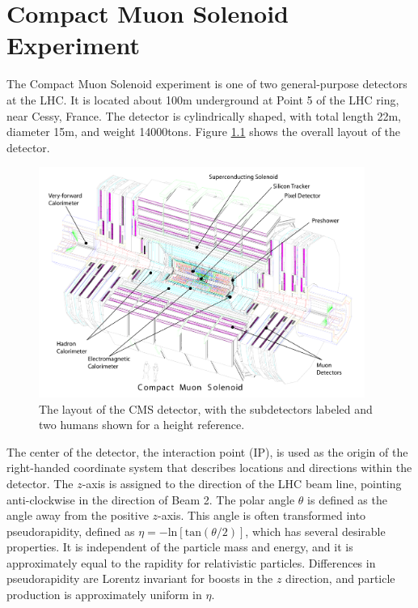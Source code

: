 \chapter{Compact Muon Solenoid Experiment
\label{ch:cmsexperiment}}
\setcounter{section}{-1}

The Compact Muon Solenoid experiment is one of two general-purpose detectors at the LHC. It is located about 100\unit{m} underground at Point 5 of the LHC ring, near Cessy, France. The detector is cylindrically shaped, with total length 22\unit{m}, diameter 15\unit{m}, and weight 14000\unit{tons}. Figure \ref{fig:cms-overall} shows the overall layout of the detector.

\begin{figure}[hbt]
\begin{center}
\includegraphics[width=0.95\textwidth]{figures/cms_complete_labelled.pdf}
\caption{The layout of the CMS detector, with the subdetectors labeled and two humans shown for a height reference.}
\label{fig:cms-overall}
\end{center}
\end{figure}

The center of the detector, the interaction point (IP), is used as the origin of the right-handed coordinate system that describes locations and directions within the detector. The $z$-axis is assigned to the direction of the LHC beam line, pointing anti-clockwise in the direction of Beam 2. The polar angle $\theta$ is defined as the angle away from the positive $z$-axis. This angle is often transformed into pseudorapidity, defined as $\eta = -\text{ln}[\text{tan}(\theta/2)]$, which has several desirable properties. It is independent of the particle mass and energy, and it is approximately equal to the rapidity for relativistic particles. Differences in pseudorapidity are Lorentz invariant for boosts in the $z$ direction, and particle production is approximately uniform in $\eta$.

